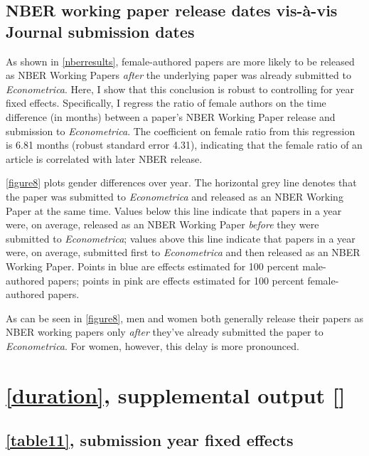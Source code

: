 \begin{appendices}


\clearpage

\subsection{NBER working paper release dates vis-à-vis Journal submission dates}
\label{appendixsubmitrelease}

As shown in \autoref{nberresults}, female-authored papers are more likely to be released as NBER Working Papers \emph{after} the underlying paper was already submitted to \emph{Econometrica}. Here, I show that this conclusion is robust to controlling for year fixed effects. Specifically, I regress the ratio of female authors on the time difference (in months) between a paper's NBER Working Paper release and submission to \emph{Econometrica}. The coefficient on female ratio from this regression is 6.81 months (robust standard error 4.31), indicating that the female ratio of an article is correlated with later NBER release.

\autoref{figure8} plots gender differences over year. The horizontal grey line denotes that the paper was submitted to \emph{Econometrica} and released as an NBER Working Paper at the same time. Values below this line indicate that papers in a year were, on average, released as an NBER Working Paper \emph{before} they were submitted to \emph{Econometrica}; values above this line indicate that papers in a year were, on average, submitted first to \emph{Econometrica} and then released as an NBER Working Paper. Points in blue are effects estimated for 100 percent male-authored papers; points in pink are effects estimated for 100 percent female-authored papers.



As can be seen in \autoref{figure8}, men and women both generally release their papers as NBER working papers only \emph{after} they've already submitted the paper to \emph{Econometrica}. For women, however, this delay is more pronounced.

\clearpage

\section{\autoref{duration}, supplemental output []}
\label{durationsupplementaloutput}

\subsection{\autoref{table11}, submission year fixed effects}
\label{appendixsubmissionyear}


\end{appendices}
